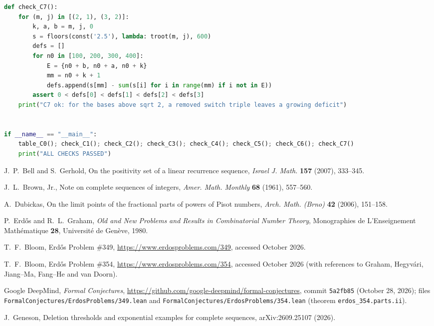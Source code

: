 \documentclass[11pt]{amsart}
\theoremstyle{definition}
\theoremstyle{remark}
\begin{document}
\begin{lstlisting}[language=Python]
def check_C7():
    for (m, j) in [(2, 1), (3, 2)]:
        k, a, b = m, j, 0
        s = floors(const('2.5'), lambda: troot(m, j), 600)
        defs = []
        for n0 in [100, 200, 300, 400]:
            E = {n0 + b, n0 + a, n0 + k}
            mm = n0 + k + 1
            defs.append(s[mm] - sum(s[i] for i in range(mm) if i not in E))
        assert 0 < defs[0] < defs[1] < defs[2] < defs[3]
    print("C7 ok: for the bases above sqrt 2, a removed switch triple leaves a growing deficit")


if __name__ == "__main__":
    table_C0(); check_C1(); check_C2(); check_C3(); check_C4(); check_C5(); check_C6(); check_C7()
    print("ALL CHECKS PASSED")
\end{lstlisting}

\begin{thebibliography}{99}

 J.~P.~Bell and S.~Gerhold, On the positivity set of a linear recurrence
sequence, \emph{Israel J. Math.} \textbf{157} (2007), 333--345.

 J.~L.~Brown, Jr., Note on complete sequences of integers, \emph{Amer. Math.
Monthly} \textbf{68} (1961), 557--560.

 A.~Dubickas, On the limit points of the fractional parts of powers of Pisot
numbers, \emph{Arch. Math. (Brno)} \textbf{42} (2006), 151--158.

 P.~Erd\H{o}s and R.~L.~Graham, \emph{Old and New Problems and Results in
Combinatorial Number Theory}, Monographies de L'Enseignement Math\'ematique \textbf{28},
Universit\'e de Gen\`eve, 1980.

 T.~F.~Bloom, Erd\H{o}s Problem \#349,
\url{https://www.erdosproblems.com/349}, accessed October 2026.

 T.~F.~Bloom, Erd\H{o}s Problem \#354,
\url{https://www.erdosproblems.com/354}, accessed October 2026 (with references to
Graham, Hegyv\'ari, Jiang--Ma, Fang--He and van Doorn).

 Google DeepMind, \emph{Formal Conjectures},
\url{https://github.com/google-deepmind/formal-conjectures}, commit \texttt{5a2fb85}
(October 28, 2026); files \nolinkurl{FormalConjectures/ErdosProblems/349.lean} and
\nolinkurl{FormalConjectures/ErdosProblems/354.lean} (theorem \texttt{erdos\_354.parts.ii}).

 J.~Geneson, Deletion thresholds and exponential examples for complete
sequences, arXiv:2609.25107 (2026).


\end{thebibliography}
\end{document}
